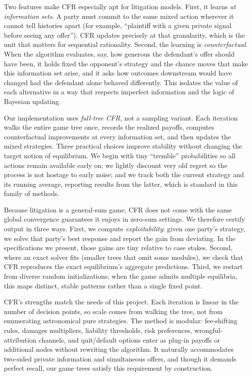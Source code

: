 \documentclass{article}
\begin{document}
Two features make CFR especially apt for litigation models. First, it learns \emph{at information sets}. A party must commit to the same mixed action wherever it cannot tell histories apart (for example, “plaintiff with a given private signal before seeing any offer”). CFR updates precisely at that granularity, which is the unit that matters for sequential rationality. Second, the learning is \emph{counterfactual}. When the algorithm evaluates, say, how generous the defendant’s offer should have been, it holds fixed the opponent’s strategy and the chance moves that make this information set arise, and it asks how outcomes downstream would have changed had the defendant alone behaved differently. This isolates the value of each alternative in a way that respects imperfect information and the logic of Bayesian updating.

Our implementation uses \emph{full-tree CFR}, not a sampling variant. Each iteration walks the entire game tree once, records the realized payoffs, computes counterfactual improvements at every information set, and then updates the mixed strategies. Three practical choices improve stability without changing the target notion of equilibrium. We begin with tiny “tremble” probabilities so all actions remain available early on; we lightly discount very old regret so the process is not hostage to early noise; and we track both the current strategy and its running average, reporting results from the latter, which is standard in this family of methods.

Because litigation is a general-sum game, CFR does not come with the same global convergence guarantees it enjoys in zero-sum settings. We therefore certify output in three ways. First, we compute \emph{exploitability}: given one party’s strategy, we solve that party’s best response and report the gain from deviating. In the specifications we present, those gains are tiny relative to case stakes. Second, where an exact solver fits (smaller trees that omit some modules), we check that CFR reproduces the exact equilibrium’s aggregate predictions. Third, we restart from diverse random initializations; when the game admits multiple equilibria, this maps distinct, stable patterns rather than a single fixed point.

CFR’s strengths match the needs of this project. Each iteration is linear in the number of decision points, so scale comes from walking the tree, not from enumerating astronomical pure strategies. The method is modular: fee-shifting rules, damages multipliers, liability thresholds, risk preferences, wrongful-attribution channels, and quit/default options enter as plug-in payoffs or additional nodes without rewriting the algorithm. It naturally accommodates two-sided private information and simultaneous offers, and though it demands perfect recall, our game trees satisfy this requirement by construction.
\end{document}
